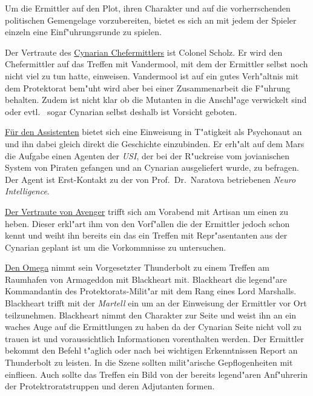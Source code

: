 

Um die Ermittler auf den Plot, ihren Charakter und auf die vorherrschenden politischen Gemengelage vorzubereiten, bietet es sich an mit jedem der Spieler einzeln eine Einf"uhrungsrunde zu spielen.

Der Vertraute des \underline{Cynarian Chefermittlers} ist Colonel Scholz. Er wird den Chefermittler auf das Treffen mit Vandermool, mit dem der Ermittler selbst noch nicht viel zu tun hatte, einweisen. Vandermool ist auf ein gutes Verh"altnis mit dem Protektorat bem"uht wird aber bei einer Zusammenarbeit die F"uhrung behalten. Zudem ist nicht klar ob die Mutanten in die Anschl"age verwickelt sind oder evtl. ~sogar Cynarian selbst deshalb ist Vorsicht geboten.

\underline{Für den Assistenten} bietet sich eine Einweisung in T"atigkeit als Psychonaut an und ihn dabei gleich direkt die Geschichte einzubinden. Er erh"alt auf dem Mars die Aufgabe einen Agenten der \emph{USI}, der bei der R"uckreise vom jovianischen System von Piraten gefangen und an Cynarian ausgeliefert wurde, zu befragen. Der Agent ist Erst-Kontakt zu der von Prof.~Dr.~Naratova betriebenen \emph{Neuro Intelligence}.

\underline{Der Vertraute von Avenger} trifft sich am Vorabend mit Artisan um einen zu heben. Dieser erkl"art ihm von den Vorf"allen die der Ermittler jedoch schon kennt und weiht ihn bereits ein das ein Treffen mit Repr"asentanten aus der Cynarian geplant ist um die Vorkommnisse zu untersuchen.

\underline{Den Omega} nimmt sein Vorgesetzter Thunderbolt zu einem Treffen am Raumhafen von Armageddon mit Blackheart mit. Blackheart die legend"are Kommandantin des Protektorats-Milit"ar mit dem Rang eines Lord Marshalls. Blackheart trifft mit der \emph{Martell} ein um an der Einweisung der Ermittler vor Ort teilzunehmen. Blackheart nimmt den Charakter zur Seite und weist ihn an ein waches Auge auf die Ermittlungen zu haben da der Cynarian Seite nicht voll zu trauen ist und voraussichtlich Informationen vorenthalten werden.
Der Ermittler bekommt den Befehl t"aglich oder nach bei wichtigen Erkenntnissen Report an Thunderbolt zu leisten. In die Szene sollten milit"arische Gepflogenheiten mit einflie\3en. Auch sollte das Treffen ein Bild von der bereits legend"aren Anf"uhrerin der Protektroratstruppen und deren Adjutanten formen.




